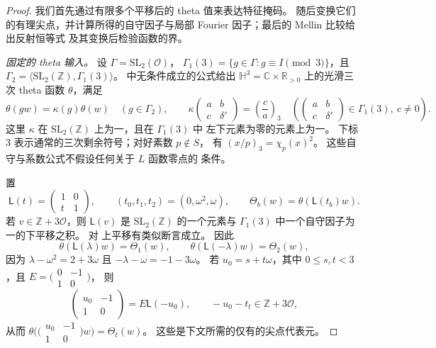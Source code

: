 \documentclass[11pt,a4paper]{article}
\numberwithin{equation}{section}
\numberwithin{figure}{section}
\theoremstyle{definition}
\theoremstyle{remark}
\begin{document}
\begin{proof}
我们首先通过有限多个平移后的 theta 值来表达特征掩码。
随后变换它们的有理尖点，并计算所得的自守因子与局部
Fourier 因子；最后的 Mellin 比较给出反射恒等式
及其变换后检验函数的界。

\emph{固定的 theta 输入。}
设 $\Gamma=\mathrm{SL}_2(\mathcal O)$，
$\Gamma_1(3)=\{g\in\Gamma:g\equiv I\pmod3\}$，且
$\Gamma_2=\langle\mathrm{SL}_2(\mathbb Z),\Gamma_1(3)\rangle$。
\cite[方程 (5.4)、(5.7)、(5.9) 与 (5.12)--(5.17)]{DR}
中无条件成立的公式给出
$\mathbb H^3=\mathbb C\times\mathbb R_{>0}$ 上的光滑三次 theta 函数 $\theta$，满足
\[
 \theta(gw)=\kappa(g)\theta(w)\quad(g\in\Gamma_2),\qquad
 \kappa\!\begin{pmatrix}a&b\\c&\delta'\end{pmatrix}
   =\left(\frac ca\right)_3\quad
   \left(\begin{pmatrix}a&b\\c&\delta'\end{pmatrix}\in\Gamma_1(3),\ c\ne0\right).
\]
这里 $\kappa$ 在 $\mathrm{SL}_2(\mathbb Z)$ 上为一，且在 $\Gamma_1(3)$ 中
左下元素为零的元素上为一。 下标 $3$
表示通常的三次剩余符号；对好素数 $p\notin S$，
有 $(x/p)_3=\chi_p(x)^2$。
这些自守与系数公式不假设任何关于 $L$ 函数零点的
条件。

置
\[
 \mathsf L(t)=\begin{pmatrix}1&0\\t&1\end{pmatrix},\qquad
 (t_0,t_1,t_2)=(0,\omega^2,\omega),\qquad
 \Theta_b(w)=\theta(\mathsf L(t_b)w).
\]
若 $v\in\mathbb Z+3\mathcal O$，则 $\mathsf L(v)$ 是
$\mathrm{SL}_2(\mathbb Z)$ 的一个元素与
$\Gamma_1(3)$ 中一个自守因子为一的下平移之积。 对
上平移有类似断言成立。 因此
\[
 \theta(\mathsf L(\lambda)w)=\Theta_1(w),\qquad
 \theta(\mathsf L(-\lambda)w)=\Theta_2(w),
\]
因为 $\lambda-\omega^2=2+3\omega$ 且
$-\lambda-\omega=-1-3\omega$。 若 $u_0=s+t\omega$，其中
$0\le s,t<3$，且 $E=\bigl(\begin{smallmatrix}0&-1\\1&0\end{smallmatrix}\bigr)$，
则
\[
 \begin{pmatrix}u_0&-1\\1&0\end{pmatrix}=E\mathsf L(-u_0),
 \qquad -u_0-t_t\in\mathbb Z+3\mathcal O,
\]
从而 $\theta\bigl(\bigl(\begin{smallmatrix}u_0&-1\\1&0\end{smallmatrix}\bigr)w\bigr)
=\Theta_t(w)$。 这些是下文所需的仅有的尖点代表元。


\end{proof}
\end{document}
